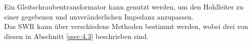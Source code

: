             Ein Gleitschraubentransformator kann genutzt werden, um den Hohlleiter zu einer gegebenen und unveränderlichen Impedanz anzupassen.\\
            Das SWR kann über verschiedene Methoden bestimmt werden, wobei drei von diesen in Abschnitt \ref{ssec:4.3} beschrieben sind.

%
%
